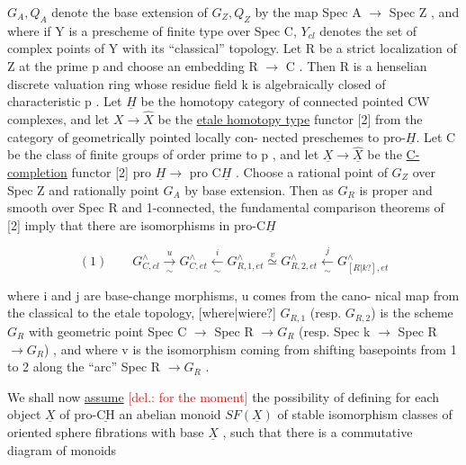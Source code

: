 \documentclass[11pt]{article}
\newcommand{\scanpage}[1]{\par\bigskip\noindent{\small\sffamily[scan #1]}\par}
\newcommand{\mspage}[1]{{\small\sffamily[p.\,#1]}}
\newcommand{\hand}[1]{\textcolor{blue}{#1}}
\newcommand{\deleted}[1]{\textcolor{red}{[\textsf{del.:} #1]}}
\newcommand{\uline}[1]{\underline{#1}}
\newcommand{\unsure}[1]{[#1?]}
\begin{document}
$G_A,Q_A$ denote the base extension of $G_Z,Q_Z$ by the map Spec A $\to$
Spec Z , and where if Y is a prescheme of finite type over Spec C,
$Y_{cl}$ denotes the set of complex points of Y with its ``classical''
topology. Let R be a strict localization of Z at the prime p
and choose an embedding R $\to$ C . Then R is a henselian discrete
valuation ring whose residue field k is algebraically closed of
characteristic p . Let $\underline{H}$ be the homotopy category of connected
pointed CW complexes, and let $X \to \hat{X}$ be the \uline{etale homotopy type}
functor [2] from the category of geometrically pointed locally con-%
nected preschemes to pro-$\underline{H}$. Let C be the class of finite groups
of order prime to p , and let $\underline{X} \to \hat{\underline{X}}$ be the \uline{C-completion} functor
[2] pro $\underline{H} \to$ pro C$\underline{H}$ . Choose a rational point of $G_Z$ over Spec Z
and rationally point $G_A$ by base extension. Then as $G_R$ is proper
and smooth over Spec R and 1-connected, the fundamental comparison
theorems of [2] imply that there are isomorphisms in pro-C$\underline{H}$

\[
(1) \qquad G^{\wedge}_{C,cl} \xrightarrow[\sim]{u} G^{\wedge}_{C,et} \xleftarrow[\sim]{i} G^{\wedge}_{R,1,et} \overset{v}{\simeq} G^{\wedge}_{R,2,et} \xleftarrow[\sim]{j} G^{\wedge}_{\unsure{R|k},et}
\]

where i and j are base-change morphisms, u comes from the cano-%
nical map from the classical to the etale topology, \unsure{where|wiere} $G_{R,1}$
(resp. $G_{R,2}$) is the scheme $G_R$ with geometric point Spec C $\to$
Spec R $\to G_R$ (resp. Spec k $\to$ Spec R $\to G_R$) , and where v is the
isomorphism coming from shifting basepoints from 1 to 2 along the
``arc'' Spec R $\to G_R$ .

\mspage{\hand{59}}

\clearpage
\scanpage{162-5/60}
\mspage{- 4 -}

We shall now \uline{assume} \deleted{for the moment} the possibility of defining
for each object $\underline{X}$ of pro-$\underline{\mathrm{CH}}$ an abelian monoid $SF(\underline{X})$ of stable
isomorphism classes of oriented sphere fibrations with base $\underline{X}$ ,
such that there is a commutative diagram of monoids
\end{document}
